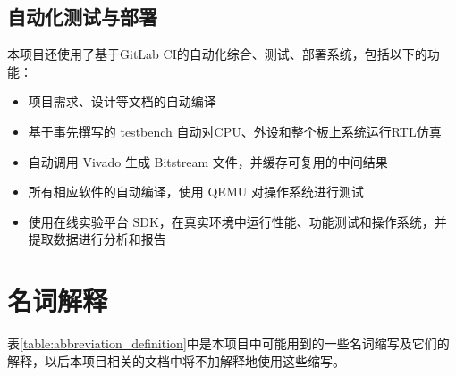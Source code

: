 

\subsection{自动化测试与部署}

本项目还使用了基于GitLab CI的自动化综合、测试、部署系统，包括以下的功能：

\begin{itemize}

    \item 项目需求、设计等文档的自动编译
    \item 基于事先撰写的 testbench 自动对CPU、外设和整个板上系统运行RTL仿真
    \item 自动调用 Vivado 生成 Bitstream 文件，并缓存可复用的中间结果
    \item 所有相应软件的自动编译，使用 QEMU 对操作系统进行测试
    \item 使用在线实验平台 SDK，在真实环境中运行性能、功能测试和操作系统，并提取数据进行分析和报告

\end{itemize}

\section{名词解释}

表\ref{table:abbreviation_definition}中是本项目中可能用到的一些名词缩写及它们的解释，以后本项目相关的文档中将不加解释地使用这些缩写。

